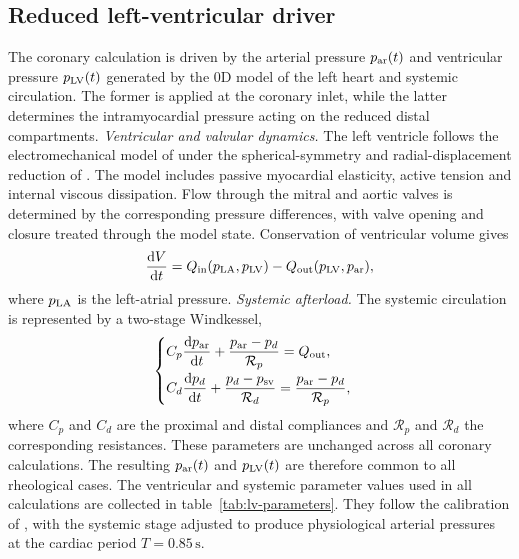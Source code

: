 \documentclass[lineno]{jfm}
\begin{document}
\subsection{Reduced left-ventricular driver}
\label{sec:0d}
The coronary calculation is driven by the arterial pressure
$p_{\rm ar}(t)$ and ventricular pressure $p_{\rm LV}(t)$ generated by the
0D model of the left heart and systemic circulation. The former is applied at
the coronary inlet, while the latter determines the intramyocardial pressure
acting on the reduced distal compartments.
\medskip
\noindent\textit{Ventricular and valvular dynamics.}
The left ventricle follows the electromechanical model of
\citet{chapelle2012energy} under the spherical-symmetry and radial-displacement
reduction of \citet{caruel2014dimensional}. The model includes passive
myocardial elasticity, active tension and internal viscous dissipation. Flow
through the mitral and aortic valves is determined by the corresponding
pressure differences, with valve opening and closure treated through the model
state. Conservation of ventricular volume gives
\begin{equation}
\frac{\mathrm{d}V}{\mathrm{d}t}
=
Q_{\rm in}(p_{\rm LA},p_{\rm LV})
-
Q_{\rm out}(p_{\rm LV},p_{\rm ar}),
\label{eq:lv-mass-balance}
\end{equation}
where $p_{\rm LA}$ is the left-atrial pressure.
\medskip
\noindent\textit{Systemic afterload.}
The systemic circulation is represented by a two-stage Windkessel,
\begin{equation}
\begin{cases}
C_p \dfrac{\mathrm{d}p_{\rm ar}}{\mathrm{d}t}
  + \dfrac{p_{\rm ar}-p_d}{\mathcal{R}_p}
  = Q_{\rm out}, \\[8pt]
C_d \dfrac{\mathrm{d}p_d}{\mathrm{d}t}
  + \dfrac{p_d-p_{\rm sv}}{\mathcal{R}_d}
  = \dfrac{p_{\rm ar}-p_d}{\mathcal{R}_p},
\end{cases}
\label{eq:systemic-windkessel}
\end{equation}
where $C_p$ and $C_d$ are the proximal and distal compliances and
$\mathcal{R}_p$ and $\mathcal{R}_d$ the corresponding resistances. These
parameters are unchanged across all coronary calculations. The resulting
$p_{\rm ar}(t)$ and $p_{\rm LV}(t)$ are therefore common to all rheological
cases.
The ventricular and systemic parameter values used in all calculations are
collected in table~\ref{tab:lv-parameters}. They follow the calibration of
\citet{caruel2014dimensional}, with the systemic stage adjusted to produce
physiological arterial pressures at the cardiac period $T=0.85\,\mathrm{s}$.
\end{document}
